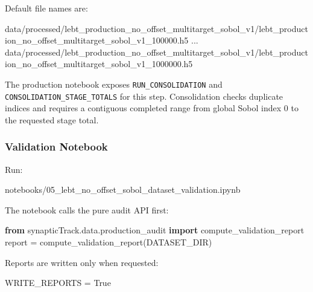 \documentclass[
]{article}
\newenvironment{Shaded}{}{}
\newcommand{\ImportTok}[1]{\textcolor[rgb]{0.00,0.50,0.00}{\textbf{#1}}}
\newcommand{\NormalTok}[1]{#1}
\newcommand{\OperatorTok}[1]{\textcolor[rgb]{0.40,0.40,0.40}{#1}}
\newcommand{\VariableTok}[1]{\textcolor[rgb]{0.10,0.09,0.49}{#1}}
\begin{document}
Default file names are:

\begin{Shaded}
\begin{Highlighting}[]
\NormalTok{data/processed/lebt\_production\_no\_offset\_multitarget\_sobol\_v1/lebt\_production\_no\_offset\_multitarget\_sobol\_v1\_100000.h5}
\NormalTok{...}
\NormalTok{data/processed/lebt\_production\_no\_offset\_multitarget\_sobol\_v1/lebt\_production\_no\_offset\_multitarget\_sobol\_v1\_1000000.h5}
\end{Highlighting}
\end{Shaded}

The production notebook exposes \texttt{RUN\_CONSOLIDATION} and
\texttt{CONSOLIDATION\_STAGE\_TOTALS} for this step. Consolidation
checks duplicate indices and requires a contiguous completed range from
global Sobol index 0 to the requested stage total.

\hypertarget{validation-notebook}{%
\subsubsection{Validation Notebook}\label{validation-notebook}}

Run:

\begin{Shaded}
\begin{Highlighting}[]
\NormalTok{notebooks/05\_lebt\_no\_offset\_sobol\_dataset\_validation.ipynb}
\end{Highlighting}
\end{Shaded}

The notebook calls the pure audit API first:

\begin{Shaded}
\begin{Highlighting}[]
\ImportTok{from}\NormalTok{ synapticTrack.data.production\_audit }\ImportTok{import}\NormalTok{ compute\_validation\_report}
\NormalTok{report }\OperatorTok{=}\NormalTok{ compute\_validation\_report(DATASET\_DIR)}
\end{Highlighting}
\end{Shaded}

Reports are written only when requested:

\begin{Shaded}
\begin{Highlighting}[]
\NormalTok{WRITE\_REPORTS }\OperatorTok{=} \VariableTok{True}
\end{Highlighting}
\end{Shaded}
\end{document}
